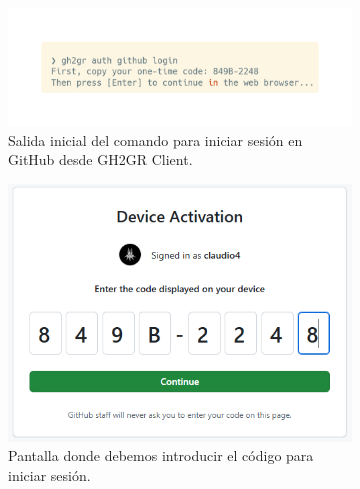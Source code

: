\begin{figure}
    \begin{subfigure}{0.32\textwidth}
        \includegraphics[width=\linewidth]{images/client-gh-login-code.png}
        \caption{Salida inicial del comando para iniciar sesión en GitHub desde GH2GR Client.}
        \label{fig:gh-client-login:cli}
    \end{subfigure}
    \hspace*{\fill}
    \begin{subfigure}{0.32\textwidth}
        \includegraphics[width=\linewidth]{images/insert-gh-auth-code.png}
        \caption{Pantalla donde debemos introducir el código para iniciar sesión.}
        \label{fig:gh-client-login:code}
    \end{subfigure}
    \hspace*{\fill}
    \begin{subfigure}{0.32\textwidth}

\end{subfigure}
\end{figure}

